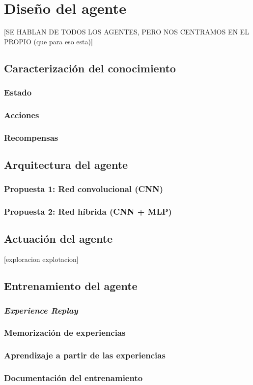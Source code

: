 \chapter{Diseño del agente}

[SE HABLAN DE TODOS LOS AGENTES, PERO NOS CENTRAMOS EN EL PROPIO (que para eso esta)]

\section{Caracterización del conocimiento}

\subsection{Estado}

\subsection{Acciones}

\subsection{Recompensas}
 
\section{Arquitectura del agente}

\subsection{Propuesta 1: Red convolucional (CNN)}

\subsection{Propuesta 2: Red híbrida (CNN + MLP)}

\section{Actuación del agente}
[exploracion explotacion]

\section{Entrenamiento del agente}

\subsection{\textit{Experience Replay}}

\subsection{Memorización de experiencias}

\subsection{Aprendizaje a partir de las experiencias}

\subsection{Documentación del entrenamiento}